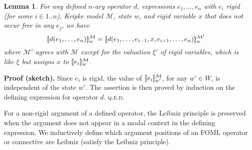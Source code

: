 \documentclass{easychair}
\renewcommand{\qed}{\hspace*{\fill}\textsc{q.e.d.}}
\newcommand{\sem}[1]{\ensuremath{[\![ #1 ]\!]}}
\newcommand{\MM}{\mathcal{M}}
\newtheorem{lemma}[theorem]{Lemma}
\newenvironment{proofsketch}{\par\noindent\textbf{Proof (sketch).}\quad}{\medskip}
\let\notla\relax
\begin{document}
\begin{lemma}\label{thm:rigid-leibniz}
  For any defined $n$-ary operator $d$, expressions $e_1, \ldots, e_n$ with
  $e_i$ rigid (for some $i \in 1..n$), Kripke model $\MM$, state $w$, and
  rigid variable $x$ that does not occur free in any $e_j$, we have
%
  \[\notla
    \sem{d(e_1,\ldots,e_n)}^{\MM}_w =
    \sem{d(e_1,\ldots,e_{i-1},x,e_{i+1},\ldots,e_n)}^{\MM'}_w
  \]
%
  where $\MM'$ agrees with $\MM$ except for the valuation $\xi'$ of rigid
  variables, which is like $\xi$ but assigns $x$ to $\notla\sem{e_i}^{\MM}_w$.
\end{lemma}
\begin{proofsketch}
  Since $e_i$ is rigid, the value of
  $\notla\sem{e_i}^{\MM}_{w'}$, for any $w' \in W$, is independent of the state
  $w'$. The assertion is then proved by induction on the defining expression for
  operator $d$.
%
  \qed
\end{proofsketch}

For a non-rigid argument of a defined operator, the Leibniz principle is
preserved when the argument does not appear in a modal context in the defining
expression. We inductively define which argument positions of an FOML operator or
connective are Leibniz (satisfy the Leibniz principle).
\end{document}
